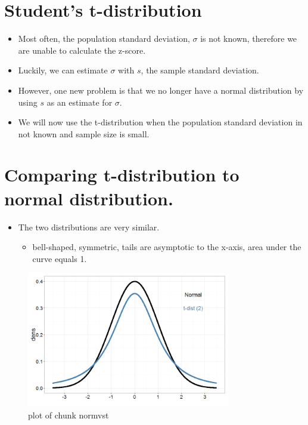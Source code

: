 \documentclass[12pt]{article}
\begin{document}
\section{Student's t-distribution}\label{students-t-distribution}

\begin{itemize}
\itemsep1pt\parskip0pt
\item
  Most often, the population standard deviation, \(\sigma\) is not
  known, therefore we are unable to calculate the z-score.
\item
  Luckily, we can estimate \(\sigma\) with \(s\), the sample standard
  deviation.
\item
  However, one new problem is that we no longer have a normal
  distribution by using \(s\) as an estimate for \(\sigma\).
\item
  We will now use the t-distribution when the population standard
  deviation in not known and sample size is small.
\end{itemize}

\section{Comparing t-distribution to normal
distribution.}\label{comparing-t-distribution-to-normal-distribution.}

\begin{itemize}
\itemsep1pt\parskip0pt
\item
  The two distributions are very similar.

  \begin{itemize}
  \itemsep1pt\parskip0pt
  \item
    bell-shaped, symmetric, tails are asymptotic to the x-axis, area
    under the curve equals 1.
  \end{itemize}
\end{itemize}

\begin{figure}[H]
\centering
\includegraphics[width=3.5in]{figure/normvst-1.png}
\caption{plot of chunk normvst}
\end{figure}
\end{document}
